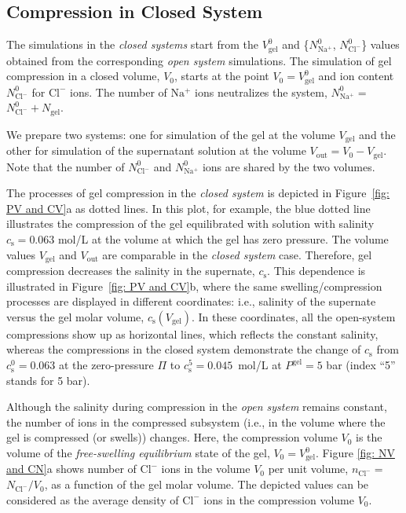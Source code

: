 \documentclass[gels,article,accept,pdftex,moreauthors]{Definitions/mdpi}
\newcommand{\ie}{{i.e.,} }
\newcommand{\ncl}{n_\mathrm{Cl^-}}
\newcommand{\Nna}{N_\mathrm{Na^+}}
\newcommand{\Ncl}{N_\mathrm{Cl^-}}
\newcommand{\gel}{^\mathrm{gel}}
\newcommand{\cl}{\mathrm{Cl^-}}
\newcommand{\na}{\mathrm{Na^+}}
\newcommand{\cs}{c_{\mathrm{s}}}
\newcommand{\Vgel}{V_\mathrm{gel}}
\newcommand{\Ngel}{N_\mathrm{gel}}
\newcommand{\Pgel}{\Pi}
\newcommand{\Vout}{V_\mathrm{out}}
\newcommand{\Vbox}{V_0}
\newcommand{\reffig}[1]{Figure~\ref{#1}}
\begin{document}
\subsection{Compression in Closed System}
The simulations in the \emph{closed systems} start from the $\Vgel^0$ and \{$\Nna^0$, $\Ncl^0$\} values
obtained from the corresponding \emph{open system} simulations.
The simulation of gel compression in a closed volume, $\Vbox$, starts at the point $\Vbox = \Vgel^0$
and ion content $\Ncl^0$ for $\cl$ ions. The number of $\na$ ions neutralizes the system, $\Nna^0 = $$\Ncl^0 + \Ngel$.

We prepare two systems: one for simulation of the gel at the volume $\Vgel$
and the other for simulation of the supernatant solution at the volume $\Vout = \Vbox - \Vgel$.
Note that the number of $\Ncl^0$ and $\Nna^0$ ions  %
are shared by the two volumes. 

The processes of gel compression in the \emph{closed system} is depicted in Figure~\ref{fig: PV and CV}a as dotted lines.
In this plot, for example, the blue dotted line illustrates the compression of the gel equilibrated with solution with salinity $\cs=0.063$ mol/L at the volume at which the gel has zero pressure. 
The volume values $\Vgel$ and $\Vout$ are comparable in the \emph{closed system} case.
Therefore, gel compression decreases the salinity in the supernate, $\cs$. 
This dependence is illustrated in \reffig{fig: PV and CV}b, where the same swelling/compression processes are displayed in different coordinates: \ie salinity of the supernate versus the gel molar volume, $\cs(\Vgel)$.
In these coordinates, all the open-system compressions show up as horizontal lines, which reflects the constant salinity, whereas the compressions in the closed system demonstrate the change of $\cs$ from $\cs^{0}=0.063$ at the zero-pressure $\Pgel$ to $\cs^{5}=0.045$~mol/L at $P\gel=5$ bar (index ``5'' stands for 5 bar). 

Although the salinity during compression in the \emph{open system} remains constant, the number of ions in the compressed subsystem (\ie in the volume where the gel is compressed (or swells)) changes.
Here, the compression volume $\Vbox$ is the volume of the \emph{free-swelling equilibrium} state of the gel, $\Vbox = \Vgel^0$.
Figure \ref{fig: NV and CN}a shows number of $\cl$ ions in the volume $\Vbox$ per unit volume, $\ncl =$ $\Ncl/\Vbox$, as a function of the gel molar volume. 
The depicted values can be considered as the average density of $\cl$ ions in the compression volume $\Vbox$. 
\end{document}
